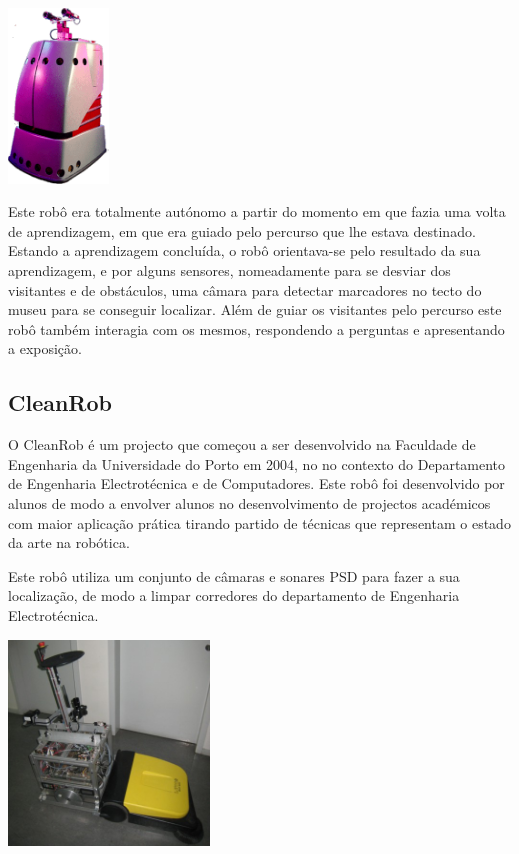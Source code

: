 \begin{center}
	\includegraphics[width=0.20\textwidth]{figures/minerva.png}
	\label{fig:4}
\end{center}

Este robô era totalmente autónomo a partir do momento em que fazia uma volta de
aprendizagem, em que era guiado pelo percurso que lhe estava destinado. Estando
a aprendizagem concluída, o robô orientava-se pelo resultado da sua aprendizagem,
e por alguns sensores, nomeadamente para se desviar dos visitantes e de obstáculos,
uma câmara para detectar marcadores no tecto do museu para se conseguir localizar.
Além de guiar os visitantes pelo percurso este robô também interagia com os mesmos,
respondendo a perguntas e apresentando a exposição.

\subsection{CleanRob}

O CleanRob é um projecto que começou a ser desenvolvido na Faculdade de Engenharia da 
Universidade do Porto em 2004, no no contexto do Departamento de Engenharia
Electrotécnica e de Computadores. Este robô foi desenvolvido por alunos de modo a
envolver alunos no desenvolvimento de projectos académicos com maior aplicação prática
tirando partido de técnicas que representam o estado da arte na robótica.

Este robô utiliza um conjunto de câmaras e sonares PSD para fazer a sua localização,
de modo a limpar corredores do departamento de Engenharia Electrotécnica.

\begin{center}
	\includegraphics[width=0.40\textwidth]{figures/clean_rob.jpeg}
	\label{fig:6}
\end{center}


